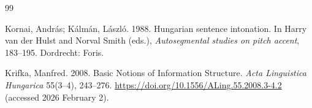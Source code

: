 \documentclass[a4paper, ruler]{CUP-JNL-LIN}%
\begin{document}
\begin{Backmatter}
\begin{thebibliography}{99}

{Kornai, András; Kálmán, László}. 1988. Hungarian sentence intonation. In Harry van der Hulst and Norval Smith (eds.), \textit{Autosegmental studies on pitch accent}, 183--195. Dordrecht: Foris.




{Krifka, Manfred}. 2008. Basic Notions of Information Structure. \textit{Acta Linguistica Hungarica} 55(3--4), 243--276. \url{https://doi.org/10.1556/ALing.55.2008.3-4.2} (accessed 2026 February 2).




\end{thebibliography}
\end{Backmatter}
\end{document}
